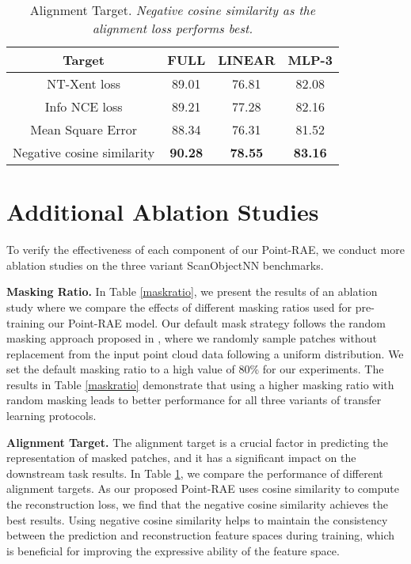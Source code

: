 \documentclass[sigconf, screen]{acmart}
\begin{document}
\begin{table}[]
   \centering
   \caption{Alignment Target. \textit{Negative cosine similarity as the alignment loss performs best.}}
    \begin{tabular}{cccc}
        \toprule
        Target & FULL & LINEAR & MLP-3\\
        \midrule
         NT-Xent loss   &89.01& 76.81 & 82.08\\
         Info NCE loss  &89.21 &77.28 & 82.16\\
         Mean Square Error &88.34& 76.31 & 81.52\\
         Negative cosine similarity &\textbf{90.28} & \textbf{78.55} & \textbf{83.16}\\
         \bottomrule
    \end{tabular}
    \label{alignloss}
\end{table}

\section{Additional Ablation Studies}
To verify the effectiveness of each component of our Point-RAE, we conduct more ablation studies on the three variant ScanObjectNN benchmarks. 

\noindent \textbf{Masking Ratio.}
In Table \ref{maskratio}, we present the results of an ablation study where we compare the effects of different masking ratios used for pre-training our Point-RAE model. Our default mask strategy follows the random masking approach proposed in \cite{pang2022masked, dong2022autoencoders}, where we randomly sample patches without replacement from the input point cloud data following a uniform distribution. We set the default masking ratio to a high value of 80\% for our experiments.
The results in Table \ref{maskratio} demonstrate that using a higher masking ratio with random masking leads to better performance for all three variants of transfer learning protocols.

\noindent \textbf{Alignment Target.}
The alignment target is a crucial factor in predicting the representation of masked patches, and it has a significant impact on the downstream task results.
In Table \ref{alignloss}, we compare the performance of different alignment targets.
As our proposed Point-RAE uses cosine similarity to compute the reconstruction loss, we find that the negative cosine similarity achieves the best results.
Using negative cosine similarity helps to maintain the consistency between the prediction and reconstruction feature spaces during training, which is beneficial for improving the expressive ability of the feature space.
 
\end{document}
